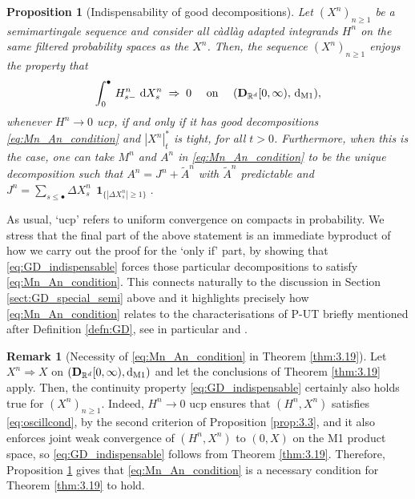 \documentclass[11pt]{article}
\newtheorem{prop}[theorem]{Proposition}
\theoremstyle{definition}\newtheorem{example}[theorem]{Example}
\theoremstyle{definition}\newtheorem{counterexample}[theorem]{Counterexample}
\theoremstyle{definition}\newtheorem{remark}[theorem]{Remark}
\theoremstyle{definition}\newtheorem{defi}[theorem]{Definition}
\numberwithin{equation}{section}
\newcommand{\R}{\mathbb{R}}
\newcommand{\D}{{\bf D}}											%
\newcommand*\diff{\mathop{}\!\mathrm{d}}								%
\newcommand{\ind}{\operatorname{\mathbf{1}}}							%
\renewcommand{\|}{\; : \, \;}											%
\newcommand{\dM}{\diff_{\operatorname{M1}}}							%
\begin{document}
\begin{prop}[Indispensability of good decompositions] \label{prop:necessity_GD}
	Let $(X^n)_{n\ge 1}$ be a semimartingale sequence and consider all càdlàg adapted integrands $H^n$ on the same filtered probability spaces as the $X^{n}$. Then, the sequence $(X^n)_{n\ge 1}$ enjoys the property that
	\begin{equation}\label{eq:GD_indispensable}\int_0^\bullet \, H^{n}_{s-} \, \diff X^{n}_s \; \Rightarrow \; 0 \quad \text{ on } \quad (\D_{\R^{d}}[0,\infty), \, \dM),
	\end{equation}
	whenever $H^{n} \to 0$ ucp, if and only if it has good decompositions \eqref{eq:Mn_An_condition} and $|X^n|_t^*$ is tight, for all $t> 0$. Furthermore, when this is the case, one can take $M^n$ and $A^n$ in \eqref{eq:Mn_An_condition} to be the unique decomposition such that $A^n = J^n + \tilde{A}^n$ with $\tilde{A}^n$ predictable and $J^n = \sum_{s\leq \bullet} \Delta X^n_s \, \ind_{\{|\Delta X^n_s|\geq 1\}}$.
\end{prop}


As usual, `ucp' refers to uniform convergence on compacts in probability. We stress that the final part of the above statement is an immediate byproduct of how we carry out the proof for the `only if' part, by showing that \eqref{eq:GD_indispensable} forces those particular decompositions to satisfy \eqref{eq:Mn_An_condition}. This connects naturally to the discussion in Section \ref{sect:GD_special_semi} above and it highlights precisely how \eqref{eq:Mn_An_condition} relates to the characterisations of P-UT briefly mentioned after Definition \ref{defn:GD}, see in particular \cite[Thm.~IV.6.21]{shiryaev} and \cite[Lem.~3.1]{jakubowskimeminpages}.

\begin{remark}[Necessity of \eqref{eq:Mn_An_condition} in Theorem \ref{thm:3.19}]\label{rem:GD_necessity} Let $X^n \Rightarrow X$ on $(\D_{\R^d}[0,\infty), \dM)$ and let the conclusions of Theorem \ref{thm:3.19} apply. Then, the continuity property \eqref{eq:GD_indispensable} certainly also holds true for $(X^n)_{n\geq1}$. Indeed, $H^{n} \to 0$ ucp ensures that $(H^n,X^n)$ satisfies \eqref{eq:oscillcond}, by the second criterion of Proposition \ref{prop:3.3}, and it also enforces joint weak convergence of $(H^n,X^n)$ to $(0,X)$ on the M1 product space, so \eqref{eq:GD_indispensable} follows from Theorem \ref{thm:3.19}. Therefore, Proposition \ref{prop:necessity_GD} gives that \eqref{eq:Mn_An_condition} is a necessary condition for Theorem \ref{thm:3.19} to hold.
\end{remark}
\end{document}
